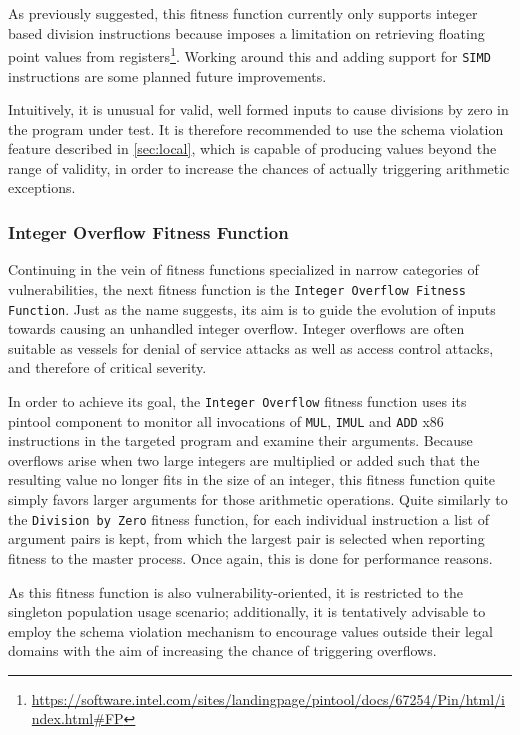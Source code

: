 As previously suggested, this fitness function currently only supports integer based division instructions
because \pin imposes a limitation on retrieving floating point values from
registers\footnote{\url{https://software.intel.com/sites/landingpage/pintool/docs/67254/Pin/html/index.html\#FP}}.
Working around this and adding support for \texttt{SIMD} instructions are some planned future improvements.

Intuitively, it is unusual for valid, well formed inputs to cause divisions by zero in the program under
test. It is therefore recommended to use the schema violation feature described in \cref{sec:local}, which is
capable of producing values beyond the range of validity, in order to increase the chances of actually
triggering arithmetic exceptions.

\subsubsection{Integer Overflow Fitness Function}
Continuing in the vein of fitness functions specialized in narrow categories of vulnerabilities, the next
fitness function is the \texttt{Integer Overflow Fitness Function}. Just as the name suggests, its aim is to
guide the evolution of inputs towards causing an unhandled integer overflow. Integer overflows are often
suitable as vessels for denial of service attacks as well as access control attacks, and therefore of
critical severity. 

In order to achieve its goal, the \texttt{Integer Overflow} fitness function uses its pintool component to
monitor all invocations of \texttt{MUL}, \texttt{IMUL} and \texttt{ADD} x86 instructions in the targeted
program and examine their arguments. Because overflows arise when two large integers are multiplied or added
such that the resulting value no longer fits in the size of an integer, this fitness function quite simply
favors larger arguments for those arithmetic operations. Quite similarly to the \texttt{Division by Zero}
fitness function, for each individual instruction a list of argument pairs is kept, from which the largest pair
is selected when reporting fitness to the \java master process. Once again, this is done for performance
reasons.
 
As this fitness function is also vulnerability-oriented, it is restricted to the singleton population usage
scenario; additionally, it is tentatively advisable to employ the schema violation mechanism to encourage
values outside their legal domains with the aim of increasing the chance of triggering overflows.

